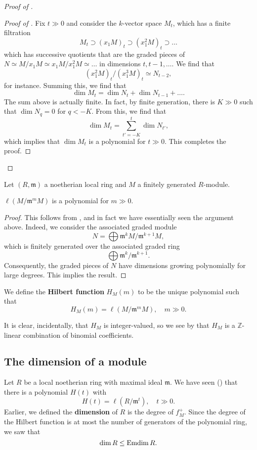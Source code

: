 \begin{proof}[Proof of  ]
\begin{proof}[Proof of ]
Fix $t \gg 0$ and consider the $k$-vector space $M_t$, which has a finite filtration 
\[ M_t \supset (x_1 M)_t \supset (x_1^2 M)_t \supset \dots  \]
which has successive quotients that are the  graded pieces of $N \simeq
M/x_1 M \simeq x_1 M/x_1^2 M \simeq \dots$ in dimensions $t, t-1, \dots$. We
find that
\[ (x_1^2 M)_t/(x_1^3 M)_t \simeq N_{t-2},  \]
for instance. Summing this, we find that
\[ \dim M_t = \dim N_t + \dim N_{t-1} + \dots . \]
The sum above is actually finite. In fact, by finite generation, there is $K
\gg 0 $ such that $\dim N_q  = 0$ for $q< -K$. From this, we find that 
\[ \dim M_t = \sum_{t' = -K}^{t} \dim N_{t'},  \]
which implies that $\dim M_t$ is a polynomial for $t \gg 0$. This completes
the proof.
\end{proof} 
\end{proof}


Let $(R, \mathfrak{m})$ a noetherian local ring and $M$ a finitely generated
$R$-module. 
\begin{proposition} \label{hilbertlocalring} 
$\ell(M/\mathfrak{m}^m M)$ is a polynomial for $m \gg 0$. 
\end{proposition} 
\begin{proof} 
This follows from , and in fact we have
essentially seen the argument above. Indeed, we consider the
associated graded module
\[ N = \bigoplus \mathfrak{m}^k M/\mathfrak{m}^{k+1}M , \]
which is finitely generated over the associated graded ring
\[ \bigoplus \mathfrak{m}^k/\mathfrak{m}^{k+1}.  \]
Consequently, the graded pieces of $N$ have dimensions growing polynomially
for large degrees. This implies the result. 

\end{proof} 
\begin{definition} 
We define the \textbf{Hilbert function} $H_M(m)$  to be the unique polynomial
such that 
\[ H_M(m) = \ell(M/ \mathfrak{m}^m M), \quad m \gg 0.  \]
\end{definition} 

It is clear, incidentally, that $H_M$ is integer-valued, so we see by
 that $H_M$ is a $\mathbb{Z}$-linear
combination of binomial coefficients.

\subsection{The dimension of a module}
Let $R $ be a local noetherian ring with maximal ideal $\mathfrak{m}$. We
have seen () that  there is a polynomial $H(t)$ with
\[ H(t) = \ell(R/\mathfrak{m}^t), \quad t \gg 0.  \]
Earlier, we defined the \textbf{dimension} of $R$ is the degree of $f_M^+$. 
Since the degree of the Hilbert function is at most the number of generators
of the polynomial ring, we saw that 
\[ \dim R \leq \operatorname{Emdim} R.  \]

